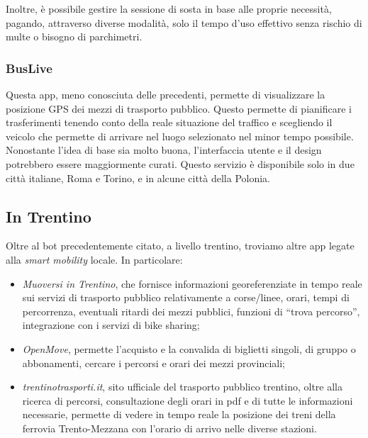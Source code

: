 \noindent Inoltre, è possibile gestire la sessione di sosta in base alle proprie necessità, pagando, attraverso diverse modalità, solo il tempo d'uso effettivo senza rischio di multe o bisogno di parchimetri. 

\subsubsection{BusLive}

Questa app, meno conosciuta delle precedenti, permette di visualizzare la posizione GPS dei mezzi di trasporto pubblico. Questo permette di pianificare i trasferimenti tenendo conto della reale situazione del traffico e scegliendo il veicolo che permette di arrivare nel luogo selezionato nel minor tempo possibile.
Nonostante l'idea di base sia molto buona, l'interfaccia utente e il design potrebbero essere maggiormente curati. 
Questo servizio è disponibile solo in due città italiane, Roma e Torino, e in alcune città della Polonia.

\subsection{In Trentino}

Oltre al bot precedentemente citato, a livello trentino, troviamo altre app legate alla \textit{smart mobility} locale. In particolare: 
\begin{itemize}
    \item \textit{Muoversi in Trentino}, che fornisce informazioni georeferenziate in tempo reale sui servizi di trasporto pubblico relativamente a corse/linee, orari, tempi di percorrenza, eventuali ritardi dei mezzi pubblici, funzioni di “trova percorso”, integrazione con i servizi di bike sharing;
    \item \textit{OpenMove}, permette l'acquisto e la convalida di biglietti singoli, di gruppo o abbonamenti, cercare i percorsi e orari dei mezzi provinciali;
    \item \textit{trentinotrasporti.it}, sito ufficiale del trasporto pubblico trentino, oltre alla ricerca di percorsi, consultazione degli orari in pdf e di tutte le informazioni necessarie, permette di vedere in tempo reale la posizione dei treni della ferrovia Trento-Mezzana con l'orario di arrivo nelle diverse stazioni. 
\end{itemize}
